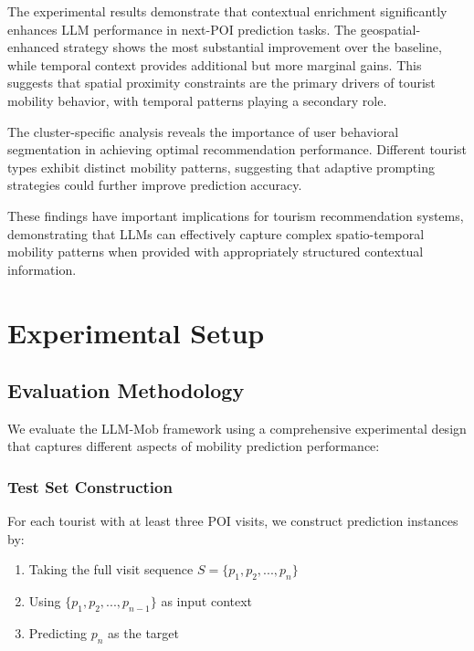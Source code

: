 \documentclass[12pt,a4paper]{article}
\begin{document}
The experimental results demonstrate that contextual enrichment significantly enhances LLM performance in next-POI prediction tasks. The geospatial-enhanced strategy shows the most substantial improvement over the baseline, while temporal context provides additional but more marginal gains. This suggests that spatial proximity constraints are the primary drivers of tourist mobility behavior, with temporal patterns playing a secondary role.

The cluster-specific analysis reveals the importance of user behavioral segmentation in achieving optimal recommendation performance. Different tourist types exhibit distinct mobility patterns, suggesting that adaptive prompting strategies could further improve prediction accuracy.

These findings have important implications for tourism recommendation systems, demonstrating that LLMs can effectively capture complex spatio-temporal mobility patterns when provided with appropriately structured contextual information.

\section{Experimental Setup}

\subsection{Evaluation Methodology}

We evaluate the LLM-Mob framework using a comprehensive experimental design that captures different aspects of mobility prediction performance:

\subsubsection{Test Set Construction}
For each tourist with at least three POI visits, we construct prediction instances by:
\begin{enumerate}
\item Taking the full visit sequence $S = \{p_1, p_2, ..., p_n\}$
\item Using $\{p_1, p_2, ..., p_{n-1}\}$ as input context
\item Predicting $p_n$ as the target
\end{enumerate}
\end{document}
